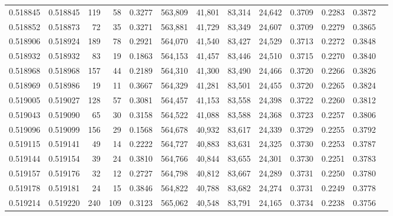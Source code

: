 \begin{tabular}{rrrrrrrrrrrrr}
0.518845 & 0.518845 &   119 &    58 &                                     0.3277 & 563,809 &  41,801 &  83,314 &  24,642 & 0.3709 & 0.2283 & 0.3872 \\
0.518852 & 0.518873 &    72 &    35 &                                     0.3271 & 563,881 &  41,729 &  83,349 &  24,607 & 0.3709 & 0.2279 & 0.3865 \\
0.518906 & 0.518924 &   189 &    78 &                                     0.2921 & 564,070 &  41,540 &  83,427 &  24,529 & 0.3713 & 0.2272 & 0.3848 \\
0.518932 & 0.518932 &    83 &    19 &                                     0.1863 & 564,153 &  41,457 &  83,446 &  24,510 & 0.3715 & 0.2270 & 0.3840 \\
0.518968 & 0.518968 &   157 &    44 &                                     0.2189 & 564,310 &  41,300 &  83,490 &  24,466 & 0.3720 & 0.2266 & 0.3826 \\
0.518969 & 0.518986 &    19 &    11 &                                     0.3667 & 564,329 &  41,281 &  83,501 &  24,455 & 0.3720 & 0.2265 & 0.3824 \\
0.519005 & 0.519027 &   128 &    57 &                                     0.3081 & 564,457 &  41,153 &  83,558 &  24,398 & 0.3722 & 0.2260 & 0.3812 \\
0.519043 & 0.519090 &    65 &    30 &                                     0.3158 & 564,522 &  41,088 &  83,588 &  24,368 & 0.3723 & 0.2257 & 0.3806 \\
0.519096 & 0.519099 &   156 &    29 &                                     0.1568 & 564,678 &  40,932 &  83,617 &  24,339 & 0.3729 & 0.2255 & 0.3792 \\
0.519115 & 0.519141 &    49 &    14 &                                     0.2222 & 564,727 &  40,883 &  83,631 &  24,325 & 0.3730 & 0.2253 & 0.3787 \\
0.519144 & 0.519154 &    39 &    24 &                                     0.3810 & 564,766 &  40,844 &  83,655 &  24,301 & 0.3730 & 0.2251 & 0.3783 \\
0.519157 & 0.519176 &    32 &    12 &                                     0.2727 & 564,798 &  40,812 &  83,667 &  24,289 & 0.3731 & 0.2250 & 0.3780 \\
0.519178 & 0.519181 &    24 &    15 &                                     0.3846 & 564,822 &  40,788 &  83,682 &  24,274 & 0.3731 & 0.2249 & 0.3778 \\
0.519214 & 0.519220 &   240 &   109 &                                     0.3123 & 565,062 &  40,548 &  83,791 &  24,165 & 0.3734 & 0.2238 & 0.3756 \\

\end{tabular}
